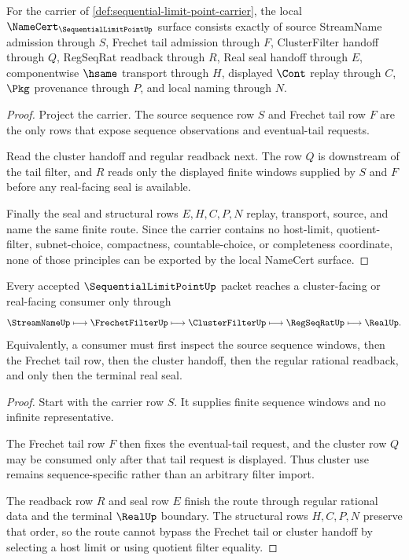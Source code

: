 \begin{theorem}
\label{thm:sequential-limit-point-namecert-obligations}
For the carrier of \autoref{def:sequential-limit-point-carrier}, the local $\NameCert_{\SequentialLimitPointUp}$ surface consists exactly of source StreamName admission through $S$, Frechet tail admission through $F$, ClusterFilter handoff through $Q$, RegSeqRat readback through $R$, Real seal handoff through $E$, componentwise $\hsame$ transport through $H$, displayed $\Cont$ replay through $C$, $\Pkg$ provenance through $P$, and local naming through $N$.
\end{theorem}
\begin{proof}
Project the carrier. The source sequence row $S$ and Frechet tail row $F$ are the only rows that expose sequence observations and eventual-tail requests.

Read the cluster handoff and regular readback next. The row $Q$ is downstream of the tail filter, and $R$ reads only the displayed finite windows supplied by $S$ and $F$ before any real-facing seal is available.

Finally the seal and structural rows $E,H,C,P,N$ replay, transport, source, and name the same finite route. Since the carrier contains no host-limit, quotient-filter, subnet-choice, compactness, countable-choice, or completeness coordinate, none of those principles can be exported by the local NameCert surface.
\end{proof}

\begin{theorem}
\label{thm:sequential-limit-point-frechet-cluster-route}
Every accepted $\SequentialLimitPointUp$ packet reaches a cluster-facing or real-facing consumer only through
$$
\StreamNameUp \longmapsto \FrechetFilterUp \longmapsto \ClusterFilterUp \longmapsto \RegSeqRatUp \longmapsto \RealUp .
$$
Equivalently, a consumer must first inspect the source sequence windows, then the Frechet tail row, then the cluster handoff, then the regular rational readback, and only then the terminal real seal.
\end{theorem}
\begin{proof}
Start with the carrier row $S$. It supplies finite sequence windows and no infinite representative.

The Frechet tail row $F$ then fixes the eventual-tail request, and the cluster row $Q$ may be consumed only after that tail request is displayed. Thus cluster use remains sequence-specific rather than an arbitrary filter import.

The readback row $R$ and seal row $E$ finish the route through regular rational data and the terminal $\RealUp$ boundary. The structural rows $H,C,P,N$ preserve that order, so the route cannot bypass the Frechet tail or cluster handoff by selecting a host limit or using quotient filter equality.
\end{proof}

